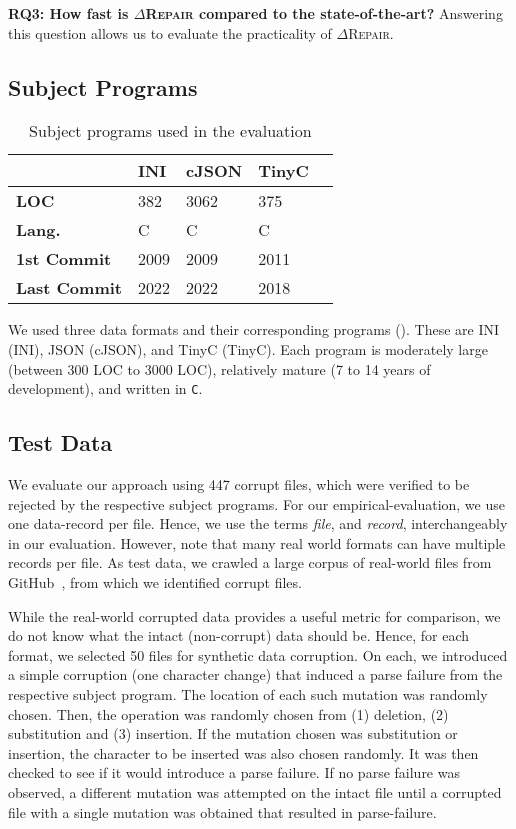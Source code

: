 \documentclass[acmsmall,screen,review,anonymous]{acmart}
\newcommand{\approach}{\textsc{$\Delta$Repair}\xspace}
\newcommand{\drepair}{\approach}
\def\<#1>{\texttt{#1}}
\begin{document}
\noindent\textbf{RQ3: How fast is \drepair compared to the state-of-the-art?}
Answering this question allows us to evaluate the practicality of \drepair.


\subsection{Subject Programs} %
\begin{table}[!tbp]\centering
\caption{Subject programs used in the evaluation}
\begin{tabular}{|p{4cm}|p{2cm}|p{2cm}|p{2cm}|p{2cm}|}
\hline
\textbf{} & \textbf{INI} & \textbf{cJSON} & \textbf{TinyC} \\
\hline
\textbf{LOC} & 382 & 3062 & 375\\
\textbf{Lang.} & C & C & C \\
\textbf{1st Commit} & 2009 & 2009 & 2011\\
\textbf{Last Commit} & 2022 & 2022 & 2018\\
\hline
\end{tabular}
\label{tab:subjectprograms}
\end{table}

We used three data formats and their corresponding programs (). These are INI (INI), JSON (cJSON), and TinyC (TinyC). Each program is moderately large (between 300 LOC to 3000 LOC), relatively mature (7 to 14 years of development), and written in \<C>.

\subsection{Test Data} 

We evaluate our approach using 447 corrupt files, which were verified to be
rejected by the respective subject programs.
For our empirical-evaluation, we use one data-record per file. Hence, we use
the terms \emph{file}, and \emph{record}, interchangeably in our evaluation.
However, note that many real world formats can have multiple records per file.
As test data, we crawled a large corpus of real-world files
from GitHub~\cite{githubapi}, from which we identified corrupt files. 

While the real-world corrupted data provides a useful metric for comparison,
we do not know what the intact (non-corrupt) data should be. Hence,
for each format, we selected 50 files for synthetic data corruption. On each,
we introduced a simple corruption (one character change) that induced a
parse failure from the respective subject program. The location of each 
such mutation was randomly chosen. Then, the operation was randomly chosen
from (1) deletion, (2) substitution and (3) insertion. If the mutation
chosen was substitution or insertion, the character to be inserted was
also chosen randomly. It was then checked to see if it would introduce
a parse failure. If no parse failure was observed, a different mutation
was attempted on the intact file until a corrupted file with a single
mutation was obtained that resulted in parse-failure.
\end{document}
